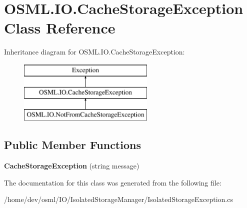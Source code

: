 \hypertarget{classOSML_1_1IO_1_1CacheStorageException}{}\section{O\+S\+M\+L.\+I\+O.\+Cache\+Storage\+Exception Class Reference}
\label{classOSML_1_1IO_1_1CacheStorageException}
Inheritance diagram for O\+S\+M\+L.\+I\+O.\+Cache\+Storage\+Exception\+:\begin{figure}[H]
\begin{center}
\leavevmode
\includegraphics[height=3.000000cm]{classOSML_1_1IO_1_1CacheStorageException}
\end{center}
\end{figure}
\subsection*{Public Member Functions}
\begin{DoxyCompactItemize}
\item 
\mbox{\label{classOSML_1_1IO_1_1CacheStorageException_a5bae3a988b74fffb77577ac2a868a4bd}} 
{\bfseries Cache\+Storage\+Exception} (string message)
\end{DoxyCompactItemize}


The documentation for this class was generated from the following file\+:\begin{DoxyCompactItemize}
\item 
/home/dev/osml/\+I\+O/\+Isolated\+Storage\+Manager/Isolated\+Storage\+Exception.\+cs\end{DoxyCompactItemize}

